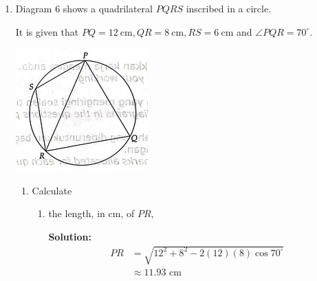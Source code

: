 \documentclass{report}
\newcommand{\sol}{\textbf{Solution:}}
\begin{document}
\begin{enumerate}[leftmargin=*]
\begin{enumerate}
\begin{enumerate}
                        \item Hence, find the cost of producing the snacks in the year 2019 if the
                              corresponding cost in the year 2022 is RM325.40.

                              \sol{}
                              \begin{align*}
                                  \dfrac{P_{2022}}{P_{2019}} \times 100 & = 137.6                            \\
                                  \dfrac{325.40}{P_{2019}} \times 100   & = 137.6                            \\
                                  P_{2019}                              & = \dfrac{325.40}{137.6} \times 100 \\
                                                                        & = \text{RM }236.48
                              \end{align*}
                    \end{enumerate}
          \end{enumerate}

    \item Diagram 6 shows a quadrilateral $P Q R S$ inscribed in a circle.

          It is given that $P Q=12 \mathrm{~cm}, Q R=8 \mathrm{~cm}, R S=6 \mathrm{~cm}$
          and $\angle P Q R=70^{\circ}$.
          \begin{center}
              \includegraphics[width=0.4\textwidth]{./assets/1555.png}
          \end{center}
          \begin{enumerate}
              \item Calculate
                    \begin{enumerate}
                        \item the length, in $\mathrm{cm}$, of $P R$,

                              \sol{}
                              \begin{align*}
                                  PR & = \sqrt{12^2 + 8^2 - 2(12)(8)\cos 70^{\circ}} \\
                                     & \approx 11.93 \text{ cm}
                              \end{align*}


\end{enumerate}
\end{enumerate}
\end{enumerate}
\end{document}
